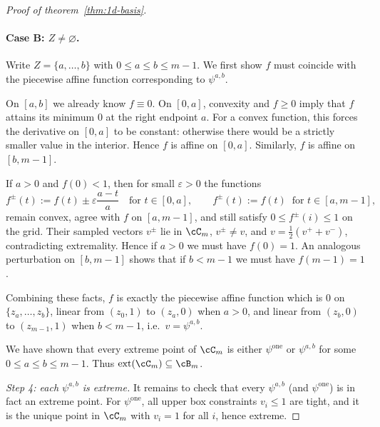 \begin{proof}[Proof of theorem~\ref{thm:1d-basis}]
    \paragraph{Case B: \texorpdfstring{$Z\neq\varnothing$}{Z!=empty}.}
    Write $Z=\{a,\dots,b\}$ with $0\le a\le b\le m-1$.
    We first show $f$ must coincide with the piecewise affine function corresponding to $\psi^{a,b}$.

    On $[a,b]$ we already know $f\equiv0$.
    On $[0,a]$, convexity and $f\ge0$ imply that $f$ attains its minimum $0$ at the
    right endpoint $a$.
    For a convex function, this forces the derivative on $[0,a]$ to be constant:
    otherwise there would be a strictly smaller value in the interior.
    Hence $f$ is affine on $[0,a]$.
    Similarly, $f$ is affine on $[b,m-1]$.

    If $a>0$ and $f(0)<1$, then for small $\varepsilon>0$ the functions
    \[
        f^\pm(t)
        :=
        f(t) \pm \varepsilon\frac{a-t}{a}
        \quad\text{for } t\in[0,a],
        \qquad
        f^\pm(t):=f(t)\ \text{ for } t\in[a,m-1],
    \]
    remain convex, agree with $f$ on $[a,m-1]$, and still satisfy $0\le f^\pm(i)\le1$
    on the grid.
    Their sampled vectors $v^\pm$ lie in $\cC_m$, $v^\pm\neq v$, and
    $v=\tfrac12(v^+ + v^-)$, contradicting extremality.
    Hence if $a>0$ we must have $f(0)=1$.
    An analogous perturbation on $[b,m-1]$ shows that if $b<m-1$ we must have
    $f(m-1)=1$.

    Combining these facts, $f$ is exactly the piecewise affine function which
    is $0$ on $\{z_a,\dots,z_b\}$,
    linear from $(z_0,1)$ to $(z_a,0)$ when $a>0$, and
    linear from $(z_b,0)$ to $(z_{m-1},1)$ when $b<m-1$,
    i.e.\ $v=\psi^{a,b}$.

    \smallskip
    We have shown that every extreme point of $\cC_m$ is either $\psi^{\mathrm{one}}$
    or $\psi^{a,b}$ for some $0\le a\le b\le m-1$.
    Thus $\mathrm{ext}(\cC_m)\subseteq \cB_m$.

    \smallskip
    \emph{Step 4: each $\psi^{a,b}$ is extreme.}
    It remains to check that every $\psi^{a,b}$ (and $\psi^{\mathrm{one}}$) is in fact
    an extreme point.
    For $\psi^{\mathrm{one}}$, all upper box constraints $v_i\le 1$ are tight, and
    it is the unique point in $\cC_m$ with $v_i=1$ for all $i$, hence extreme.


\end{proof}
